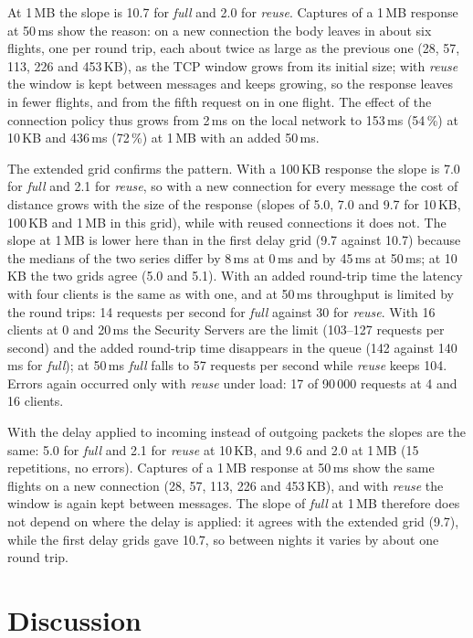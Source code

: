 \documentclass[conference,a4paper]{IEEEtran}
\begin{document}
At 1\,MB the slope is 10.7 for \emph{full} and 2.0 for \emph{reuse}.
Captures of a 1\,MB response at 50\,ms show the reason: on a new connection the body leaves in about
six flights, one per round trip, each about twice as large as the previous one (28, 57, 113, 226 and
453\,KB), as the TCP window grows from its initial size; with \emph{reuse} the window is kept between
messages and keeps growing, so the response leaves in fewer flights, and from the fifth request on
in one flight. The effect of the
connection policy thus grows from 2\,ms on the local network to 153\,ms (54\,\%) at 10\,KB and
436\,ms (72\,\%) at 1\,MB with an added 50\,ms.

The extended grid confirms the pattern. With a 100\,KB response the slope is 7.0 for \emph{full} and
2.1 for \emph{reuse}, so with a new connection for every message the cost of distance grows with the
size of the response (slopes of 5.0, 7.0 and 9.7 for 10\,KB, 100\,KB and 1\,MB in this grid), while
with reused connections it does not. The slope at 1\,MB is lower here than in the first delay grid
(9.7 against 10.7) because the medians of the two series differ by 8\,ms at 0\,ms and by 45\,ms at
50\,ms; at 10\,KB the two grids agree (5.0 and 5.1). With an added round-trip time the
latency with four clients is the same as with one, and at 50\,ms throughput is limited by the round trips: 14 requests per second for
\emph{full} against 30 for \emph{reuse}. With 16 clients at 0 and 20\,ms the Security Servers are the
limit (103--127 requests per second) and the added round-trip time disappears in the queue (142
against 140\,ms for \emph{full}); at 50\,ms \emph{full} falls to 57 requests per second while
\emph{reuse} keeps 104. Errors again occurred only with \emph{reuse} under load: 17 of 90\,000
requests at 4 and 16 clients.

With the delay applied to incoming instead of outgoing packets the slopes are the same: 5.0 for
\emph{full} and 2.1 for \emph{reuse} at 10\,KB, and 9.6 and 2.0 at 1\,MB (15 repetitions, no
errors). Captures of a 1\,MB response at 50\,ms show the same flights on a new connection (28, 57,
113, 226 and 453\,KB), and with \emph{reuse} the window is again kept between messages. The slope
of \emph{full} at 1\,MB therefore does not depend on where the delay is applied: it agrees with the
extended grid (9.7), while the first delay grids gave 10.7, so between nights it varies by about one
round trip.

\section{Discussion}
\end{document}
